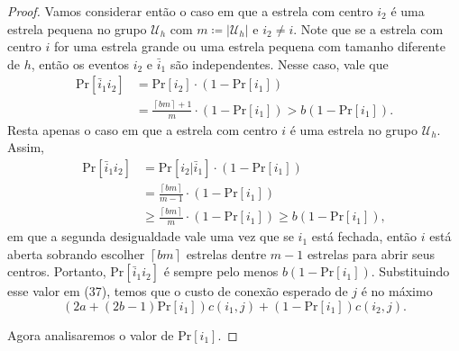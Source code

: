 \begin{proof}
    Vamos considerar então o caso em que a estrela com centro $i_2$ é uma estrela pequena no grupo $\mathcal{U}_h$ com $m \coloneqq |\mathcal{U}_h|$ e $i_2 \neq i$. Note que se a estrela com centro $i$ for uma estrela grande ou uma estrela pequena com tamanho diferente de $h$, então os eventos $i_2$ e $\bar{i}_1$ são independentes. Nesse caso, vale que 
    \begin{align}
        \text{Pr}[\bar{i}_1i_2] &= \text{Pr}[i_2] \cdot (1 - \text{Pr}[i_1]) \nonumber \\
        & = \frac{\left \lceil bm \right \rceil + 1}{m} \cdot (1 - \text{Pr}[i_1]) > b (1 - \text{Pr}[i_1]) \nonumber.
    \end{align}
    Resta apenas o caso em que a estrela com centro $i$ é uma estrela no grupo $\mathcal{U}_h$. Assim,
    \begin{align}
        \text{Pr}[\bar{i}_1i_2] &= \text{Pr}[i_2| \bar{i}_1] \cdot (1 - \text{Pr}[i_1]) \nonumber \\
        & = \frac{\left \lceil bm \right \rceil}{m - 1 } \cdot (1 - \text{Pr}[i_1]) \nonumber \\
        & \geq \frac{\left \lceil bm \right \rceil}{m} \cdot (1 - \text{Pr}[i_1]) \geq b (1 - \text{Pr}[i_1]), \nonumber
    \end{align}
    em que a segunda desigualdade vale uma vez que se $i_1$ está fechada, então $i$ está aberta sobrando escolher $\left \lceil bm \right \rceil$ estrelas dentre $m -1 $ estrelas para abrir seus centros. Portanto, Pr$[\bar{i}_1i_2]$ é sempre pelo menos $b (1 - \text{Pr}[i_1])$. Substituindo esse valor em (37), temos que o custo de conexão esperado de $j$ é no máximo
    \begin{equation}
        (2a + (2b -1) \text{Pr}[i_1])c(i_1,j) + (1 - \text{Pr}[i_1])c(i_2,j).
    \end{equation}

    Agora analisaremos o valor de Pr$[i_1]$. 
\end{proof}